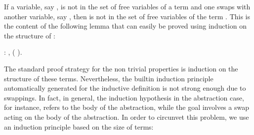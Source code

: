If a variable, say , is not in the set of free variables of a term  and one swaps  with another variable, say , then  is not in the set of free variables of the term . This is the content of the following lemma that can easily be proved using induction on the structure of :
\begin{coqdoccode}
\coqdocemptyline
\coqdocnoindent
{}  : \coqdockw{\ensuremath{\forall}}   ,         (   ).\coqdoceol
\coqdocemptyline
\coqdocemptyline
\end{coqdoccode}
The standard proof strategy for the non trivial properties is induction on the structure of these terms. Nevertheless, the builtin induction principle automatically generated for the inductive definition  is not strong enough due to swappings. In fact, in general, the induction hypothesis in the abstraction case, for instance, refers to the body of the abstraction, while the goal involves a swap acting on the body of the abstraction. In order to circunvet this problem, we use an induction principle based on the size of terms: 
